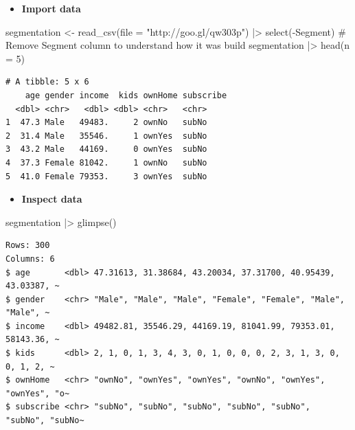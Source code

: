 \documentclass[
  ignorenonframetext,
]{beamer}
\newenvironment{Shaded}{\begin{snugshade}}{\end{snugshade}}
\newcommand{\AttributeTok}[1]{\textcolor[rgb]{0.40,0.45,0.13}{#1}}
\newcommand{\CommentTok}[1]{\textcolor[rgb]{0.37,0.37,0.37}{#1}}
\newcommand{\DecValTok}[1]{\textcolor[rgb]{0.68,0.00,0.00}{#1}}
\newcommand{\FunctionTok}[1]{\textcolor[rgb]{0.28,0.35,0.67}{#1}}
\newcommand{\NormalTok}[1]{\textcolor[rgb]{0.00,0.23,0.31}{#1}}
\newcommand{\OtherTok}[1]{\textcolor[rgb]{0.00,0.23,0.31}{#1}}
\newcommand{\SpecialCharTok}[1]{\textcolor[rgb]{0.37,0.37,0.37}{#1}}
\newcommand{\StringTok}[1]{\textcolor[rgb]{0.13,0.47,0.30}{#1}}
\providecommand{\tightlist}{%
  \setlength{\itemsep}{0pt}\setlength{\parskip}{0pt}}\usepackage{longtable,booktabs,array}
\begin{document}
\begin{frame}[fragile]{}
\label{section-3}
\begin{itemize}
\tightlist
\item
  \textbf{Import data}
\end{itemize}

\tiny

\begin{Shaded}
\begin{Highlighting}[]
\NormalTok{segmentation }\OtherTok{\textless{}{-}} \FunctionTok{read\_csv}\NormalTok{(}\AttributeTok{file =} \StringTok{"http://goo.gl/qw303p"}\NormalTok{) }\SpecialCharTok{|\textgreater{}} 
  \FunctionTok{select}\NormalTok{(}\SpecialCharTok{{-}}\NormalTok{Segment) }\CommentTok{\# Remove Segment column to understand how it was build}
\NormalTok{segmentation }\SpecialCharTok{|\textgreater{}} \FunctionTok{head}\NormalTok{(}\AttributeTok{n =} \DecValTok{5}\NormalTok{)}
\end{Highlighting}
\end{Shaded}

\begin{verbatim}
# A tibble: 5 x 6
    age gender income  kids ownHome subscribe
  <dbl> <chr>   <dbl> <dbl> <chr>   <chr>    
1  47.3 Male   49483.     2 ownNo   subNo    
2  31.4 Male   35546.     1 ownYes  subNo    
3  43.2 Male   44169.     0 ownYes  subNo    
4  37.3 Female 81042.     1 ownNo   subNo    
5  41.0 Female 79353.     3 ownYes  subNo    
\end{verbatim}
\end{frame}

\begin{frame}[fragile]{}
\label{section-4}
\begin{itemize}
\tightlist
\item
  \textbf{Inspect data}
\end{itemize}

\tiny

\begin{Shaded}
\begin{Highlighting}[]
\NormalTok{segmentation }\SpecialCharTok{|\textgreater{}} \FunctionTok{glimpse}\NormalTok{()}
\end{Highlighting}
\end{Shaded}

\begin{verbatim}
Rows: 300
Columns: 6
$ age       <dbl> 47.31613, 31.38684, 43.20034, 37.31700, 40.95439, 43.03387, ~
$ gender    <chr> "Male", "Male", "Male", "Female", "Female", "Male", "Male", ~
$ income    <dbl> 49482.81, 35546.29, 44169.19, 81041.99, 79353.01, 58143.36, ~
$ kids      <dbl> 2, 1, 0, 1, 3, 4, 3, 0, 1, 0, 0, 0, 2, 3, 1, 3, 0, 0, 1, 2, ~
$ ownHome   <chr> "ownNo", "ownYes", "ownYes", "ownNo", "ownYes", "ownYes", "o~
$ subscribe <chr> "subNo", "subNo", "subNo", "subNo", "subNo", "subNo", "subNo~
\end{verbatim}
\end{frame}
\end{document}
